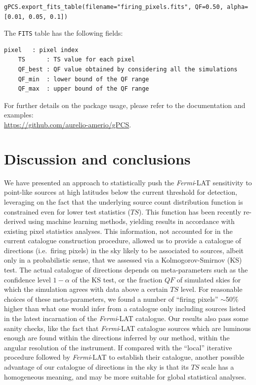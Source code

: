 \documentclass{article}
\newcommand{\Fermi}{\textit{Fermi}}
\begin{document}
\begin{lstlisting}[language=iPython]
gPCS.export_fits_table(filename="firing_pixels.fits", QF=0.50, alpha=[0.01, 0.05, 0.1])
\end{lstlisting}
The \verb|FITS| table has the following fields:
\begin{lstlisting}[basicstyle=\ttfamily]
    pixel   : pixel index
    TS      : TS value for each pixel
    QF_best : QF value obtained by considering all the simulations
    QF_min  : lower bound of the QF range
    QF_max  : upper bound of the QF range
\end{lstlisting}
For further details on the package usage, please refer to the documentation and examples: \\
\href{https://github.com/aurelio-amerio/gPCS}{https://github.com/aurelio-amerio/gPCS}.






\section{Discussion and conclusions}
\label{sec:conclusions}


We have presented an approach to statistically push the \Fermi-LAT sensitivity to point-like sources at high latitudes below  the current threshold for detection, leveraging on the fact that the underlying source count  distribution function is constrained even for lower test statistics ($TS$). This function has been recently re-derived using machine learning methods, yielding results in  accordance with existing pixel statistics analyses. This information, not accounted for in the current catalogue construction procedure, allowed us to provide a catalogue of directions (i.e.~firing pixels) in the sky likely to be associated to sources, albeit only in a probabilistic sense, that we assessed via a Kolmogorov-Smirnov (KS) test. The actual catalogue of directions depends on meta-parameters such as the confidence level $1-\alpha$ of the KS test, or the fraction $QF$ of simulated skies for which the simulation agrees with data above a certain $TS$ level. For reasonable choices of these meta-parameters, we found a number of ``firing pixels'' $\sim$50\%  higher than what one would infer from a catalogue only including sources listed in the latest incarnation of the \Fermi-LAT catalogue. Our results also pass some sanity checks, like the fact that \Fermi-LAT catalogue sources which are luminous enough are found within the directions inferred by our method, within the angular resolution of the instrument. If compared with the ``local'' iterative procedure followed by \Fermi-LAT to establish their catalogue, another possible advantage of our catalogue of directions in the sky is that its $TS$ scale has a homogeneous meaning, and may be more suitable for global statistical analyses.  
\end{document}
